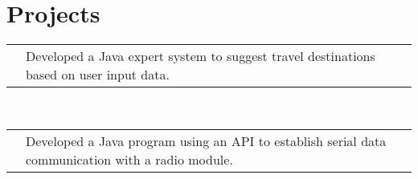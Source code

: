 \documentclass[11pt,a4paper,sans]{moderncv}
\makeatletter
\renewcommand*{\cvline}[3][.25em]{%
	  \begin{tabular}{@{}p{\hintscolumnwidth}@{\hspace{\separatorcolumnwidth}}p{\maincolumnwidth}@{}}%
          \centering\hintfont{#2} &{#3}%
	  \end{tabular}\\[#1]}
\makeatother
\begin{document}
\section{Projects}
\cvline{Artificial Intelligence}{Developed a Java expert system to suggest travel destinations based on user input data. \newline{\emph{Implemented the forward and backward chaining methods and designed the GUI in Swing}} \ENTRYSPACE}
\cvline{Data Analysis}{Developed a Java program using an API to establish serial data communication with a radio module.  \newline{\emph{Wrote the documentation and employed Git version control system}} }
\end{document}
